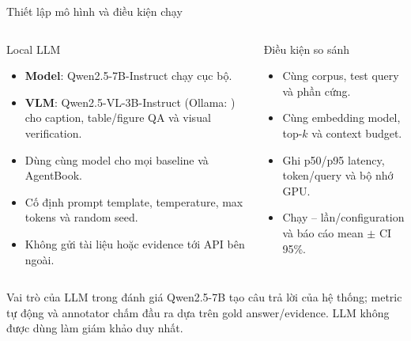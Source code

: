 \documentclass[aspectratio=169,11pt]{beamer}
\newcommand{\code}[1]{{\footnotesize\ttfamily\detokenize{#1}}}
\begin{document}
\begin{frame}{Thiết lập mô hình và điều kiện chạy}
\small
\begin{columns}[T,onlytextwidth]
\begin{block}{Local LLM}
\begin{itemize}
  \item \textbf{Model}: Qwen2.5-7B-Instruct chạy cục bộ.
  \item \textbf{VLM}: Qwen2.5-VL-3B-Instruct (Ollama: \code{qwen2.5vl:3b}) cho caption, table/figure QA và visual verification.
  \item Dùng cùng model cho mọi baseline và AgentBook.
  \item Cố định prompt template, temperature, max tokens và random seed.
  \item Không gửi tài liệu hoặc evidence tới API bên ngoài.
\end{itemize}
\end{block}
\begin{block}{Điều kiện so sánh}
\begin{itemize}
  \item Cùng corpus, test query và phần cứng.
  \item Cùng embedding model, top-$k$ và context budget.
  \item Ghi p50/p95 latency, token/query và bộ nhớ GPU.
  \item Chạy -- lần/configuration và báo cáo mean $\pm$ CI 95\%.
\end{itemize}
\end{block}
\end{columns}
\vspace{0.15cm}
\begin{block}{Vai trò của LLM trong đánh giá}
Qwen2.5-7B tạo câu trả lời của hệ thống; metric tự động và annotator chấm đầu ra dựa trên gold answer/evidence. LLM không được dùng làm giám khảo duy nhất.
\end{block}
\end{frame}
\end{document}

